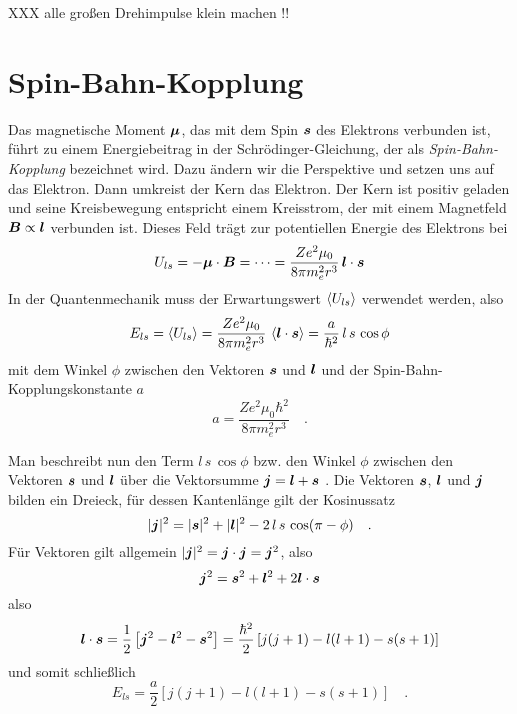 XXX alle großen Drehimpulse klein machen !!


\section{Spin-Bahn-Kopplung}

Das magnetische Moment $\boldsymbol{\mu}$, das mit dem Spin $\boldsymbol{s}$ des Elektrons verbunden ist, führt zu einem Energiebeitrag in der Schrödinger-Gleichung, der als \emph{Spin-Bahn-Kopplung} bezeichnet wird. Dazu ändern wir die Perspektive und setzen uns auf das Elektron. Dann umkreist der Kern das Elektron. Der Kern ist positiv geladen und seine Kreisbewegung entspricht einem Kreisstrom, der mit einem Magnetfeld $\boldsymbol{B} \propto \boldsymbol{l}$ verbunden ist. Dieses Feld trägt zur potentiellen Energie des Elektrons bei
\begin{equation}
    U_{ls} = - \boldsymbol{\mu} \cdot \boldsymbol{B} = \cdots = \frac{Z e^2 \mu_0}{8 \pi m_e^2 r^3} \, \boldsymbol{l} \cdot \boldsymbol{s}
\end{equation}
In der Quantenmechanik muss der Erwartungswert $\braket{U_{ls}}$ verwendet werden, also
\begin{equation}
    E_{ls} = \braket{U_{ls}} = \frac{Z e^2 \mu_0}{8 \pi m_e^2 r^3} \, \braket{\boldsymbol{l} \cdot \boldsymbol{s}}
    = \frac{a}{\hbar^2} \, l \, s \, \cos \phi
\end{equation}
mit dem Winkel $\phi$ zwischen den Vektoren $\boldsymbol{s}$ und $\boldsymbol{l}$ und der Spin-Bahn-Kopplungskonstante $a$
\begin{equation}
    a = \frac{Z e^2 \mu_0 \hbar^2}{8 \pi m_e^2 r^3} \quad . 
\end{equation}

Man beschreibt nun den Term $l \, s \, \cos \phi$ bzw. den Winkel $\phi$ zwischen den Vektoren $\boldsymbol{s}$ und $\boldsymbol{l}$ über die Vektorsumme $\boldsymbol{j} = \boldsymbol{l} + \boldsymbol{s}$ . Die Vektoren $\boldsymbol{s}$, $\boldsymbol{l}$ und $\boldsymbol{j}$ bilden ein Dreieck, für dessen Kantenlänge gilt
der Kosinussatz
\begin{equation}
    |\boldsymbol{j}|^2 =   |\boldsymbol{s}|^2 +   |\boldsymbol{l}|^2  - 2 \, l \, s \, \cos (\pi - \phi) \quad .
\end{equation}
Für Vektoren gilt allgemein $|\boldsymbol{j}|^2  = \boldsymbol{j} \cdot \boldsymbol{j} = \boldsymbol{j}^2$, also 
\begin{equation}
    \boldsymbol{j}^2 =   \boldsymbol{s}^2 +   \boldsymbol{l}^2  + 2  \boldsymbol{l} \cdot \boldsymbol{s}
\end{equation}
also
\begin{equation}
    \boldsymbol{l} \cdot \boldsymbol{s} = \frac{1}{2} \left[ \boldsymbol{j}^2 -  \boldsymbol{l}^2 -   \boldsymbol{s}^2   \right]
    = \frac{\hbar^2}{2} \left[ j(j+1) - l(l+1) - s(s+1) \right]
\end{equation}
und somit schließlich
\begin{equation}
    E_{ls}     = \frac{a}{2}  \left[ j(j+1) - l(l+1) - s(s+1) \right] \quad . 
    \label{eq:5_FS_ls}
\end{equation}

